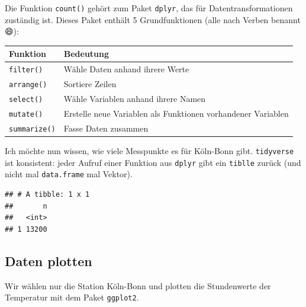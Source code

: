 \documentclass[]{book}
\newenvironment{Shaded}{\begin{snugshade}}{\end{snugshade}}
\newcommand{\CommentTok}[1]{\textcolor[rgb]{0.56,0.35,0.01}{\textit{#1}}}
\newcommand{\KeywordTok}[1]{\textcolor[rgb]{0.13,0.29,0.53}{\textbf{#1}}}
\newcommand{\NormalTok}[1]{#1}
\newcommand{\OperatorTok}[1]{\textcolor[rgb]{0.81,0.36,0.00}{\textbf{#1}}}
\newcommand{\StringTok}[1]{\textcolor[rgb]{0.31,0.60,0.02}{#1}}
\begin{document}
Die Funktion \texttt{count()} gehört zum Paket \texttt{dplyr}, das für Datentransformationen zuständig ist. Dieses Paket enthält 5 Grundfunktionen (alle nach Verben benannt 😄):

\begin{longtable}[]{@{}ll@{}}
\toprule
Funktion & Bedeutung\tabularnewline
\midrule
\endhead
\texttt{filter()} & Wähle Daten anhand ihrere Werte\tabularnewline
\texttt{arrange()} & Sortiere Zeilen\tabularnewline
\texttt{select()} & Wähle Variablen anhand ihrere Namen\tabularnewline
\texttt{mutate()} & Erstelle neue Variablen als Funktionen vorhandener Variablen\tabularnewline
\texttt{summarize()} & Fasse Daten zusammen\tabularnewline
\bottomrule
\end{longtable}

Ich möchte nun wissen, wie viele Messpunkte es für Köln-Bonn gibt. \texttt{tidyverse} ist konsistent: jeder Aufruf einer Funktion aus \texttt{dplyr} gibt ein \texttt{tiblle} zurück (und nicht mal \texttt{data.frame} mal Vektor).

\begin{Shaded}
\end{Shaded}

\begin{verbatim}
## # A tibble: 1 x 1
##       n
##   <int>
## 1 13200
\end{verbatim}

\hypertarget{daten-plotten}{%
\subsection{Daten plotten}\label{daten-plotten}}

Wir wählen nur die Station Köln-Bonn und plotten die Stundenwerte der Temperatur mit dem Paket \texttt{ggplot2}.

\begin{Shaded}
\end{Shaded}
\end{document}
